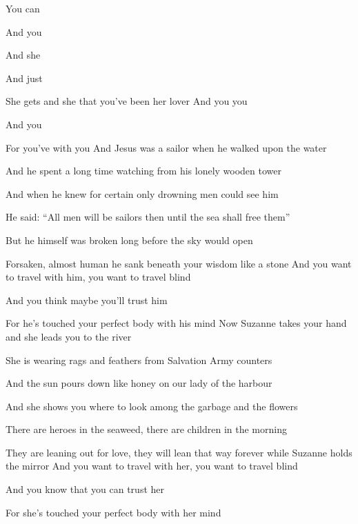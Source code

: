 
\zs
{}

You can 

And you 

And she  

And just  

She gets  and she  that you've  been her lover
\ks
\zr
And you  you 

And you  

For you've  with you 
\kr
\zs
And Jesus was a sailor when he walked upon the water

And he spent a long time watching from his lonely wooden tower

And when he knew for certain only drowning men could see him

He said: ``All men will be sailors then until the sea shall free them''

But he himself was broken long before the sky would open

Forsaken, almost human he sank beneath your wisdom like a stone
\ks
\zr
And you want to travel with him, you want to travel blind

And you think maybe you'll trust him

For he's touched your perfect body with his mind
\kr
\zs
Now Suzanne takes your hand and she leads you to the river

She is wearing rags and feathers from Salvation Army counters

And the sun pours down like honey on our lady of the harbour

And she shows you where to look among the garbage and the flowers

There are heroes in the seaweed, there are children in the morning

They are leaning out for love, they will lean that way forever while Suzanne holds the mirror
\ks
\zr
And you want to travel with her, you want to travel blind

And you know that you can trust her

For she's touched your perfect body with her mind
\kr
\kp
